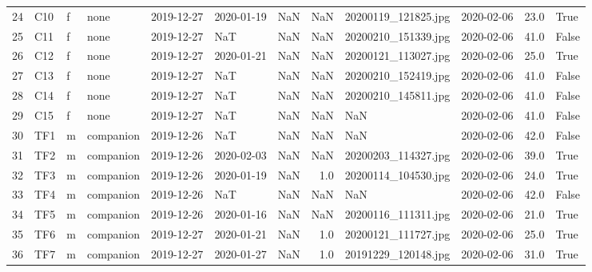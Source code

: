 \begin{longtable}{llllllrrllrl}
24 &    C10 &   f &       none &   2019-12-27 & 2020-01-19 &               NaN &                  NaN &      20200119\_121825.jpg &        2020-02-06 &  23.0 &   True \\
25 &    C11 &   f &       none &   2019-12-27 &        NaT &               NaN &                  NaN &      20200210\_151339.jpg &        2020-02-06 &  41.0 &  False \\
26 &    C12 &   f &       none &   2019-12-27 & 2020-01-21 &               NaN &                  NaN &      20200121\_113027.jpg &        2020-02-06 &  25.0 &   True \\
27 &    C13 &   f &       none &   2019-12-27 &        NaT &               NaN &                  NaN &      20200210\_152419.jpg &        2020-02-06 &  41.0 &  False \\
28 &    C14 &   f &       none &   2019-12-27 &        NaT &               NaN &                  NaN &      20200210\_145811.jpg &        2020-02-06 &  41.0 &  False \\
29 &    C15 &   f &       none &   2019-12-27 &        NaT &               NaN &                  NaN &                      NaN &        2020-02-06 &  41.0 &  False \\
30 &    TF1 &   m &  companion &   2019-12-26 &        NaT &               NaN &                  NaN &                      NaN &        2020-02-06 &  42.0 &  False \\
31 &    TF2 &   m &  companion &   2019-12-26 & 2020-02-03 &               NaN &                  NaN &      20200203\_114327.jpg &        2020-02-06 &  39.0 &   True \\
32 &    TF3 &   m &  companion &   2019-12-26 & 2020-01-19 &               NaN &                  1.0 &      20200114\_104530.jpg &        2020-02-06 &  24.0 &   True \\
33 &    TF4 &   m &  companion &   2019-12-26 &        NaT &               NaN &                  NaN &                      NaN &        2020-02-06 &  42.0 &  False \\
34 &    TF5 &   m &  companion &   2019-12-26 & 2020-01-16 &               NaN &                  NaN &      20200116\_111311.jpg &        2020-02-06 &  21.0 &   True \\
35 &    TF6 &   m &  companion &   2019-12-27 & 2020-01-21 &               NaN &                  1.0 &      20200121\_111727.jpg &        2020-02-06 &  25.0 &   True \\
36 &    TF7 &   m &  companion &   2019-12-27 & 2020-01-27 &               NaN &                  1.0 &      20191229\_120148.jpg &        2020-02-06 &  31.0 &   True \\

\end{longtable}
